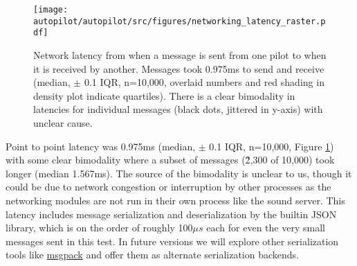 \begin{figure}
\caption{Network latency from when a message is sent from one pilot to when it is received by another. Messages took 0.975ms to send and receive (median, $\pm$ 0.1 IQR, n=10,000, overlaid numbers and red shading in density plot indicate quartiles). There is a clear bimodality in latencies for individual messages (black dots, jittered in y-axis) with unclear cause.}
\label{fig:netlag}
\texttt{[image: autopilot/autopilot/src/figures/networking\_latency\_raster.pdf]}
\end{figure}

Point to point latency was 0.975ms (median, $\pm$ 0.1 IQR, n=10,000, Figure \ref{fig:netlag}) with some clear bimodality where a subset of messages (\~2,300 of 10,000) took longer (median 1.567ms). The source of the bimodality is unclear to us, though it could be due to network congestion or interruption by other processes as the networking modules are not run in their own process like the sound server. This latency includes message serialization and deserialization by the builtin JSON library, which is on the order of roughly 100$\mu s$ each for even the very small messages sent in this test. In future versions we will explore other serialization tools like \href{https://msgpack.org/}{msgpack} and offer them as alternate serialization backends.